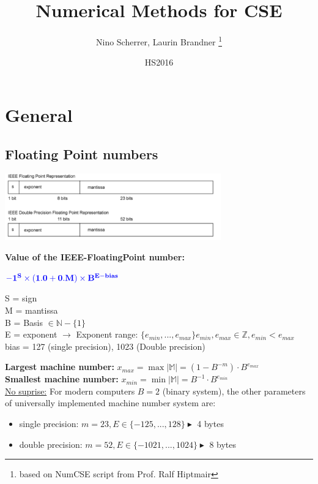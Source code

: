 \documentclass[12pt, a4paper]{article}
\title{Numerical Methods for CSE}
\author{Nino Scherrer, Laurin Brandner \thanks{based on NumCSE script from Prof. Ralf Hiptmair}}
\date{HS2016}
\newcommand{\M}{\mathbb{M}}
\begin{document}
\begin{titlepage}
\maketitle
\end{titlepage}
 
 
\section{General}

\subsection{Floating Point numbers}

\begin{center}
\includegraphics[width=0.7\textwidth]{floatingPoint_IEEE_layout.png}
\end{center}

\begin{tcolorbox}
	\textbf{Value of the IEEE-FloatingPoint number:} 
	\begin{center}
		$\color{blue}\mathbf{-1^{S} \times (1.0 + 0.M) \times B^{E-bias}}$ 
	\end{center}
	
 S = sign \\
 M = mantissa \\
 B = Basis $\in \mathbb{N}-\lbrace 1 \rbrace$ \\
 E = exponent  $\rightarrow $ Exponent range: $\lbrace e_{min}, ..., e_{max} \rbrace e_{min}, e_{max} \in \mathbb{Z}, e_{min} < e_{max}$ \\
 bias = 127 (single precision), 1023 (Double precision)
\end{tcolorbox}

\textbf{Largest machine number:} $x_{max} = \max|\M| = (1 - B^{-m}) \cdot  B^{e_{max}} $ \\
\textbf{Smallest machine number:} $x_{min} = \min|\M| = B^{-1} \cdot B^{e_{min}}$ \\

\underline{No suprise:} For modern computers $B = 2$ (binary system), the other parameters of universally implemented machine number system are:
\begin{itemize}
	\item single precision: $m=23, E \in \lbrace -125, ..., 128\rbrace \blacktriangleright$ 4 bytes 
	\item double precision: $m=52, E \in \lbrace -1021, ..., 1024 \rbrace \blacktriangleright $ 8 bytes 
\end{itemize}
\end{document}
